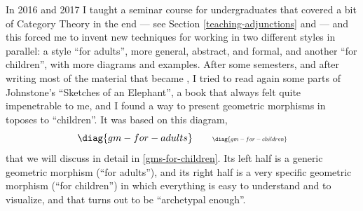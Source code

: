 \documentclass[oneside,12pt]{article}
\begin{document}
In 2016 and 2017 I taught a seminar course for undergraduates that
covered a bit of Category Theory in the end --- see Section
\ref{teaching-adjunctions} and \cite{OchsWLD2019} --- and this forced
me to invent new techniques for working in two different styles in
parallel: a style ``for adults'', more general, abstract, and formal,
and another ``for children'', with more diagrams and examples. After
some semesters, and after writing most of the material that became
\cite{PH1}, I tried to read again some parts of Johnstone's ``Sketches
of an Elephant'', a book that always felt quite impenetrable to me,
and I found a way to present geometric morphisms in toposes to
``children''. It was based on this diagram,
%
%
%
%
\pu
$$
  \diag{gm-for-adults}
  \qquad
  \def\LG{\pshAargs{G_2}{G_3}{G_4}{G_5}}
  \def\G {\pshBargs{G_1}{G_2}{G_3}{G_4}{G_5}{G_6}}
  \def\H {\pshAargs{H_2}{H_3}{H_4}{H_5}}
  \def\RH{\pshBargs{H_2{×_{H_4}}H_3}{H_2}{H_3}{H_4}{H_5}{1}}
  \scalebox{0.6}{$
  \diag{gm-for-children}
  $}
$$
%
that we will discuss in detail in \ref{gms-for-children}. Its left
half is a generic geometric morphism (``for adults''), and its right
half is a very specific geometric morphism (``for children'') in which
everything is easy to understand and to visualize, and that turns out
to be ``archetypal enough''.
\end{document}
